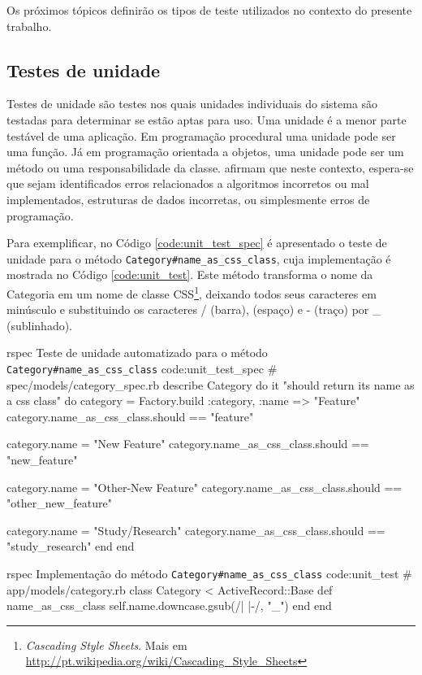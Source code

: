 Os próximos tópicos definirão os tipos de teste utilizados no contexto do presente trabalho.

\subsection{Testes de unidade}
\label{sub:testes_de_unidade}

Testes de unidade são testes nos quais unidades individuais do sistema são testadas para determinar se estão aptas para uso. Uma unidade é a menor parte testável de uma aplicação. Em programação procedural uma unidade pode ser uma função. Já em programação orientada a objetos, uma unidade pode ser um método ou uma responsabilidade da classe.  afirmam que neste contexto, espera-se que sejam identificados erros relacionados a algoritmos incorretos ou mal implementados, estruturas de dados incorretas, ou simplesmente erros de programação.

Para exemplificar, no Código \ref{code:unit_test_spec} é apresentado o teste de unidade para o método \texttt{Category\#name\_as\_css\_class}, cuja implementação é mostrada no Código \ref{code:unit_test}. Este método transforma o nome da Categoria em um nome de classe CSS\footnote{\textit{Cascading Style Sheets}. Mais em \url{http://pt.wikipedia.org/wiki/Cascading_Style_Sheets}}, deixando todos seus caracteres em minúsculo e substituindo os caracteres / (barra),  (espaço) e - (traço) por \_ (sublinhado).

\begin{mycode}{rspec}%
{Teste de unidade automatizado para o método \texttt{Category\#name\_as\_css\_class} }{code:unit_test_spec}
# spec/models/category_spec.rb
describe Category do
  it "should return its name as a css class" do
    category = Factory.build :category, :name => "Feature"
    category.name_as_css_class.should == "feature"

    category.name = "New Feature"
    category.name_as_css_class.should == "new_feature"

    category.name = "Other-New Feature"
    category.name_as_css_class.should == "other_new_feature"

    category.name = "Study/Research"
    category.name_as_css_class.should == "study_research"
  end
end
\end{mycode}

\begin{mycode}{rspec}%
{Implementação do método \texttt{Category\#name\_as\_css\_class} }{code:unit_test}
# app/models/category.rb
class Category < ActiveRecord::Base
  def name_as_css_class
    self.name.downcase.gsub(/\/| |-/, "_")
  end
end
\end{mycode}

